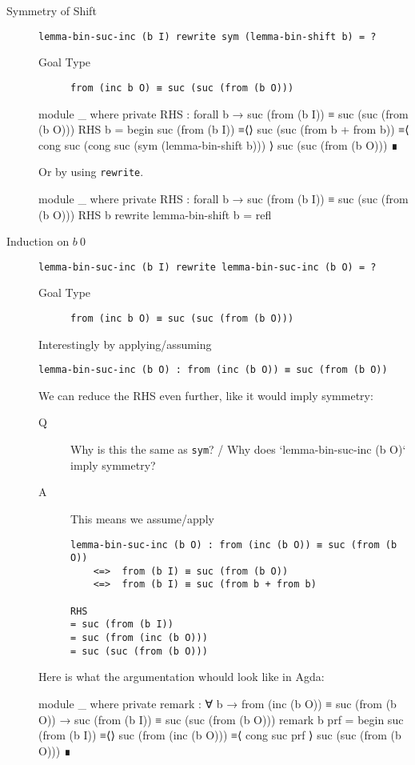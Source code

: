 \begin{description}
\item[Symmetry of Shift] \verb+lemma-bin-suc-inc (b I) rewrite sym (lemma-bin-shift b) = ?+

\begin{description}
\item[Goal Type] \verb_from (inc b O) ≡ suc (suc (from (b O)))_
\end{description}

\begin{code}
module _ where
  private
    RHS : forall b → suc (from (b I)) ≡ suc (suc (from (b O)))
    RHS b =
      begin
        suc (from (b I))
      ≡⟨⟩
        suc (suc (from b + from b))
      ≡⟨ cong suc (cong suc (sym (lemma-bin-shift b))) ⟩
        suc (suc (from (b O)))
      ∎
\end{code}
Or by using \verb_rewrite_.
\begin{code}
module _ where
  private
    RHS : forall b → suc (from (b I)) ≡ suc (suc (from (b O)))
    RHS b rewrite lemma-bin-shift b = refl
\end{code}

\item[Induction on $b~0$] \verb+lemma-bin-suc-inc (b I) rewrite lemma-bin-suc-inc (b O) = ?+
\begin{description}
\item[Goal Type] \verb_from (inc b O) ≡ suc (suc (from (b O)))_
\end{description}

Interestingly by applying/assuming
\begin{verbatim}
lemma-bin-suc-inc (b O) : from (inc (b O)) ≡ suc (from (b O))
\end{verbatim}
We can reduce the RHS even further, like it would imply symmetry:

\begin{description}
\item[Q] Why is this the same as \verb_sym_? / Why does `lemma-bin-suc-inc (b O)` imply symmetry?
\item[A] This means we assume/apply

\begin{verbatim}
lemma-bin-suc-inc (b O) : from (inc (b O)) ≡ suc (from (b O))
    <=>  from (b I) ≡ suc (from (b O))
    <=>  from (b I) ≡ suc (from b + from b)

RHS
= suc (from (b I))
= suc (from (inc (b O)))
= suc (suc (from (b O)))
\end{verbatim}
\end{description}

Here is what the argumentation whould look like in Agda:
\begin{code}
module _ where
  private
    remark : ∀ b → from (inc (b O)) ≡ suc (from (b O))
                 → suc (from (b I)) ≡ suc (suc (from (b O)))
    remark b prf =
      begin
        suc (from (b I))
      ≡⟨⟩
        suc (from (inc (b O)))
      ≡⟨ cong suc prf ⟩
        suc (suc (from (b O)))
      ∎
\end{code}
\end{description}

